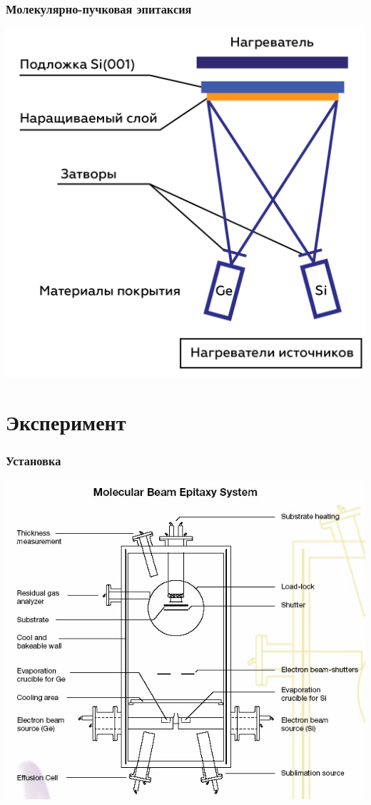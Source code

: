 \documentclass[10pt,pdf,hyperref={unicode}, dvipsnames]{beamer}
\begin{document}
\begin{frame}[t]
	\frametitle{Молекулярно-пучковая эпитаксия}
	\centering
	\includegraphics[width = .75\linewidth]{imgs/MBE.png}
\end{frame}


\section{Эксперимент}
\begin{frame}[t]
	\frametitle{Установка}
	\includegraphics[width = .8\linewidth]{imgs/exp.jpg}
\end{frame}
\end{document}
